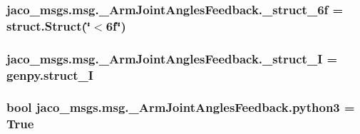 \subsubsection[{\texorpdfstring{\+\_\+struct\+\_\+6f}{_struct_6f}}]{\setlength{\rightskip}{0pt plus 5cm}jaco\+\_\+msgs.\+msg.\+\_\+\+Arm\+Joint\+Angles\+Feedback.\+\_\+struct\+\_\+6f = struct.\+Struct(\char`\"{}$<$6f\char`\"{})\hspace{0.3cm}{\ttfamily [private]}}\hypertarget{namespacejaco__msgs_1_1msg_1_1__ArmJointAnglesFeedback_a6aa86fac24ef7b41d0fab379da7134e2}{}\label{namespacejaco__msgs_1_1msg_1_1__ArmJointAnglesFeedback_a6aa86fac24ef7b41d0fab379da7134e2}
\subsubsection[{\texorpdfstring{\+\_\+struct\+\_\+I}{_struct_I}}]{\setlength{\rightskip}{0pt plus 5cm}jaco\+\_\+msgs.\+msg.\+\_\+\+Arm\+Joint\+Angles\+Feedback.\+\_\+struct\+\_\+I = genpy.\+struct\+\_\+I\hspace{0.3cm}{\ttfamily [private]}}\hypertarget{namespacejaco__msgs_1_1msg_1_1__ArmJointAnglesFeedback_a67cd06604e38dba83e4565cef0404a4c}{}\label{namespacejaco__msgs_1_1msg_1_1__ArmJointAnglesFeedback_a67cd06604e38dba83e4565cef0404a4c}
\subsubsection[{\texorpdfstring{python3}{python3}}]{\setlength{\rightskip}{0pt plus 5cm}bool jaco\+\_\+msgs.\+msg.\+\_\+\+Arm\+Joint\+Angles\+Feedback.\+python3 = True}\hypertarget{namespacejaco__msgs_1_1msg_1_1__ArmJointAnglesFeedback_a759ed6b78decd6d86899f9ba756561e3}{}\label{namespacejaco__msgs_1_1msg_1_1__ArmJointAnglesFeedback_a759ed6b78decd6d86899f9ba756561e3}

